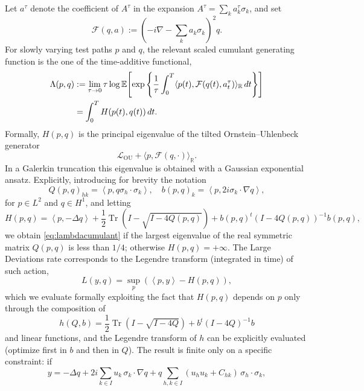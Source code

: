 \documentclass[a4paper,10pt]{amsart}
\DeclareMathOperator{\trace}{Tr}
\newcommand{\pa}[1]{\left(#1\right)}
\newcommand{\brak}[1]{\left\langle#1\right\rangle}
\theoremstyle{remark}
\numberwithin{equation}{section}
\begin{document}
Let $a^\tau$ denote the coefficient of $A^\tau$ in the
expansion \(A^\tau=\sum_k a_k^\tau\sigma_k\), and set
\begin{equation*}
    \mathcal F(q,a)
 :=\left(-i\nabla-\sum_k a_k\sigma_k\right)^2q.
\end{equation*}
For slowly varying test paths $p$ and $q$, the relevant scaled cumulant
generating function is the one of the time-additive functional,
\begin{align}\label{eq:lambdacumulant}
 \Lambda(p,q)
 &:=
 \lim_{\tau\to0}\tau\log\mathbb E\!\left[
 \exp\left\{\frac1\tau\int_0^T
 \langle p(t),\mathcal F(q(t),a_t^\tau)\rangle_{\mathbb R}\,dt
 \right\}\right]\notag\\
 &=\int_0^T H(p(t),q(t))\,dt.
\end{align}
Formally, \(H(p,q)\) is the principal eigenvalue of the tilted
Ornstein--Uhlenbeck generator
\begin{equation*}
    \mathcal L_{\mathrm{OU}}
 +\langle p,\mathcal F(q,\cdot)\rangle_{\mathbb R}.
\end{equation*}
In a Galerkin truncation this eigenvalue is obtained with a Gaussian
exponential ansatz.
Explicitly, introducing for brevity the notation
\begin{equation*}
    Q(p,q)_{hk}=\brak{p,q \sigma_h\cdot \sigma_k},
    \quad
    b(p,q)_k=\brak{p,2i\sigma_k\cdot\nabla q},
\end{equation*}
for $p\in L^2$ and $q\in H^1$, and letting
\begin{equation*}
    H(p,q)=\brak{p,-\Delta q}+\frac12 \trace\pa{I-\sqrt{I-4Q(p,q)}}+b(p,q)^t(I-4Q(p,q))^{-1}b(p,q),
\end{equation*}
we obtain \eqref{eq:lambdacumulant} if the largest eigenvalue of the real symmetric matrix $Q(p,q)$ is less than $1/4$; otherwise $H(p,q)=+\infty$.
The Large Deviations rate corresponds to the Legendre transform (integrated in time) of such action, 
\begin{equation*}
    L(y,q)=\sup_p (\brak{p,y}-H(p,q)),
\end{equation*}
which we evaluate formally exploiting the fact that $H(p,q)$ depends on $p$ only through the composition of 
\begin{equation*}
    h(Q,b)=\frac12 \trace\pa{I-\sqrt{I-4Q}}+b^t(I-4Q)^{-1}b
\end{equation*}
and linear functions, and the Legendre transform of $h$ can be explicitly evaluated (optimize first in $b$ and then in $Q$). The result is finite only on a specific constraint: if
\begin{equation*}
    y=-\Delta q
      +2i\sum_{k\in I}u_k\,\sigma_k\cdot\nabla q
      +q\sum_{h,k\in I}(u_hu_k+C_{hk})\,\sigma_h\cdot\sigma_k,
\end{equation*}
\end{document}
